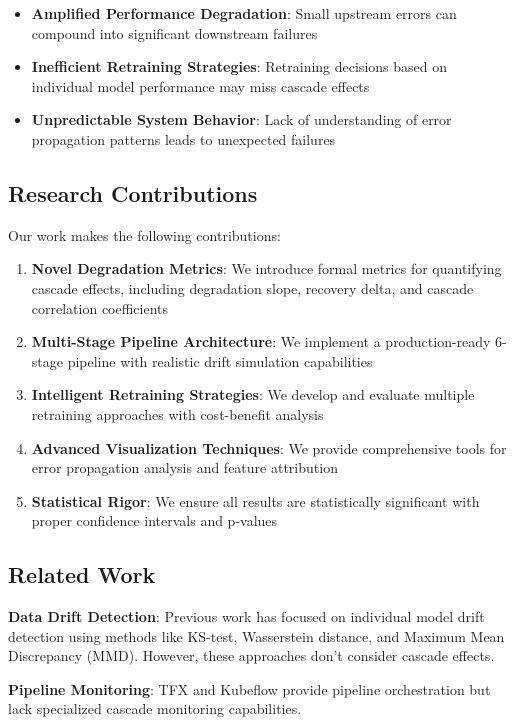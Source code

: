 \documentclass{article}
\begin{document}
\begin{itemize}
    \item \textbf{Amplified Performance Degradation}: Small upstream errors can compound into significant downstream failures
    \item \textbf{Inefficient Retraining Strategies}: Retraining decisions based on individual model performance may miss cascade effects
    \item \textbf{Unpredictable System Behavior}: Lack of understanding of error propagation patterns leads to unexpected failures
\end{itemize}

\subsection{Research Contributions}

Our work makes the following contributions:

\begin{enumerate}
    \item \textbf{Novel Degradation Metrics}: We introduce formal metrics for quantifying cascade effects, including degradation slope, recovery delta, and cascade correlation coefficients
    \item \textbf{Multi-Stage Pipeline Architecture}: We implement a production-ready 6-stage pipeline with realistic drift simulation capabilities
    \item \textbf{Intelligent Retraining Strategies}: We develop and evaluate multiple retraining approaches with cost-benefit analysis
    \item \textbf{Advanced Visualization Techniques}: We provide comprehensive tools for error propagation analysis and feature attribution
    \item \textbf{Statistical Rigor}: We ensure all results are statistically significant with proper confidence intervals and p-values
\end{enumerate}

\subsection{Related Work}

\textbf{Data Drift Detection}: Previous work has focused on individual model drift detection using methods like KS-test, Wasserstein distance, and Maximum Mean Discrepancy (MMD). However, these approaches don't consider cascade effects.

\textbf{Pipeline Monitoring}: TFX and Kubeflow provide pipeline orchestration but lack specialized cascade monitoring capabilities.
\end{document}
